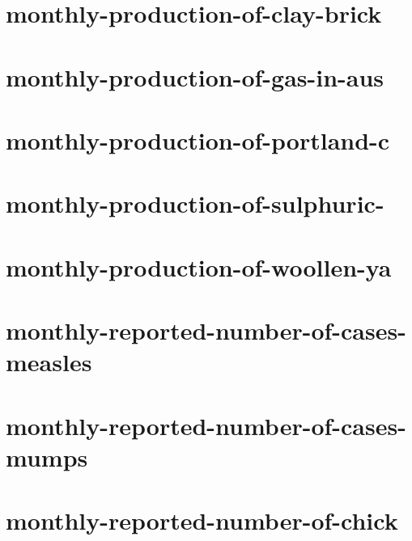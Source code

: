 \documentclass[twoside]{article}
\begin{document}
    

\section{monthly-production-of-clay-brick}

    

\section{monthly-production-of-gas-in-aus}

    

\section{monthly-production-of-portland-c}

    

\section{monthly-production-of-sulphuric-}

    

\section{monthly-production-of-woollen-ya}

    

\section{monthly-reported-number-of-cases-measles}

    

\section{monthly-reported-number-of-cases-mumps}

    

\section{monthly-reported-number-of-chick}
\end{document}
